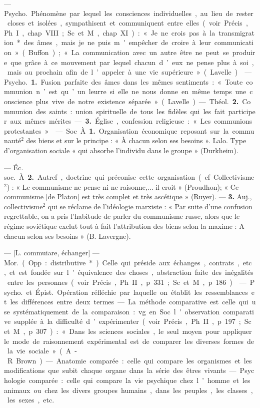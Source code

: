 \begin{itemize}[leftmargin=1cm, label=, itemsep=11pt]
 —
\si{Psycho.} Phénomène par lequel les
consciences individuelles, au lieu de
rester closes et isolées, sympathisent
et communiquent entre elles (voir
Précis, Ph. I, chap. VIII; Sc. et M.,
chap. XI) : « Je ne crois pas à la
transmigration* des âmes, mais je
ne puis m'empêcher de croire à leur
communication » (Buffon); « La
communication avec un autre être
ne peut se produire que grâce à ce
mouvement par lequel chacun d’eux
ne pense plus à soi, mais au prochain
afin de l’appeler à une vie supérieure » (Lavelle).

 — \si{Psycho.} {\bf 1.} Fusion parfaite des âmes dans les mêmes sentiments : « Toute communion n’est
qu’un leurre si elle ne nous donne en
même temps une conscience plus
vive de notre existence séparée »
(Lavelle).

— \si{Théol.} {\bf 2.} Communion des
saints : union spirituelle de tous les
fidèles qui les fait participer aux
mêmes mérites. — {\bf 3.} Église, confession religieuse : « Les communions
protestantes. »

 — Soc. À {\bf 1.} Organisation économique reposant sur la
communauté$^2$ des biens et sur le
principe : « À chacun selon ses besoins ». Lalo. Type d'organisation
sociale « qui absorbe l’individu dans
le groupe » (Durkheim).

— \si{Éc. soc.} À. {\bf 2.} Autref., doctrine
qui préconise cette organisation (cf.
Collectivisme$^2$) : « Le communisme
ne pense ni ne raisonne,... il croit »
(Proudhon); « Ce communisme [de
Platon] est très complet et très ascétique » (Ruyer). — {\bf 3.} Auj., collectivisme$^2$ qui se réclame de l’idéologie marxiste : « Par suite d’une
confusion regrettable, on a pris
l'habitude de parler du communisme russe, alors que le régime
soviétique exclut tout à fait l’attribution des biens selon la maxime :
A chacun selon ses besoins » (B. Lavergne).

 — [L. commuiare,
échanger] — \si{Mor.} (Opp. : distributive*). Celle qui préside aux échanges,
contrats, etc., et est fondée sur
l'équivalence des choses, abstraction faite des inégalités entre les
personnes (voir Précis, Ph. II,
p. 331; Sc. et M., p. 186).

 — \si{Psycho.} et \si{Épist.}
Opération réfléchie par laquelle on
établit les ressemblances et les différences entre deux termes. — La méthode comparative est celle qui use
systématiquement de la comparaison : vg. en Soc. l'observation comparative supplée à la difficulté
d’expérimenter (voir Précis, Ph. II,
p. 197; Sc. et M., p. 307) : « Dans les
sciences sociales, le seul moyen pour
appliquer le mode de raisonnement
expérimental est de comparer les
diverses formes de la vie sociale »
(A.-R. Brown). — Anatomie comparée : celle qui compare les organismes et les modifications que
subit chaque organe dans la série
des êtres vivants. — Psychologie
comparée : celle qui compare la vie
psychique chez l’homme et les animaux ou chez les divers groupes
humains, dans les peuples, les
classes, les sexes, etc.


\end{itemize}
